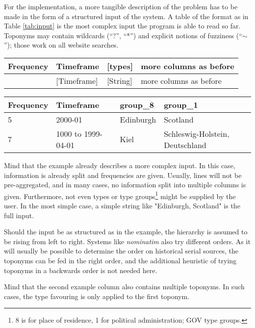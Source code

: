 \documentclass[11pt]{article}
\begin{document}
For the implementation, a more tangible description of the problem has to be made in the form of a structured input of the system. A table of the format as in Table \ref{tab:input} is the most complex input the program is able to read so far. Toponyms may contain wildcards (``?'', ``*'') and explicit notions of fuzziness (``$\sim$''); those work on all website searches.

\begin{table*}[h!]
  \centering
  \begin{tabular}{l|l|l|l}
  Frequency & Timeframe & [types] & more columns as before \\
  \hline
  [integer] & [Timeframe] & [String] & more columns as before \\
  \end{tabular}
 
  \vspace{0.5cm}
  
  \begin{tabular}{l|l|l|l}
  Frequency & Timeframe & group\_8 & group\_1 \\
  \hline
  5 & 2000-01 & Edinburgh & Scotland \\
  7 & 1000 to 1999-04-01 & Kiel & Schleswig-Holstein, Deutschland \\
  \end{tabular}
  \caption{A specification of the input and an example}
  \label{tab:input}
\end{table*}

Mind that the example already describes a more complex input. In this case, information is already split and frequencies are given. Usually, lines will not be pre-aggregated, and in many cases, no information split into multiple columns is given. Furthermore, not even types or type groups\footnote{8 is for place of residence, 1 for political administration; GOV type groups.} might be supplied by the user. In the most simple case, a simple string like "Edinburgh, Scotland" is the full input.

Should the input be as structured as in the example, the hierarchy is assumed to be rising from left to right. Systems like \emph{nominatim} also try different orders. As it will usually be possible to determine the order on historical serial sources, the toponyms can be fed in the right order, and the additional heuristic of trying toponyms in a backwards order is not needed here.

Mind that the second example column also contains multiple toponyms. In such cases, the type favouring is only applied to the first toponym.\\
\end{document}
